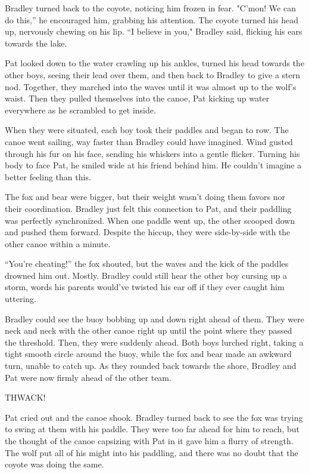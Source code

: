 Bradley turned back to the coyote, noticing him frozen in fear. "C'mon!
We can do this,'' he encouraged him, grabbing his attention. The coyote
turned his head up, nervously chewing on his lip. ``I believe in you,"
Bradley said, flicking his ears towards the lake.

Pat looked down to the water crawling up his ankles, turned his head
towards the other boys, seeing their lead over them, and then back to
Bradley to give a stern nod. Together, they marched into the waves until
it was almost up to the wolf's waist. Then they pulled themselves into
the canoe, Pat kicking up water everywhere as he scrambled to get
inside.

When they were situated, each boy took their paddles and began to row.
The canoe went sailing, way faster than Bradley could have imagined.
Wind gusted through his fur on his face, sending his whiskers into a
gentle flicker. Turning his body to face Pat, he smiled wide at his
friend behind him. He couldn't imagine a better feeling than this.

The fox and bear were bigger, but their weight wasn't doing them favors
nor their coordination. Bradley just felt this connection to Pat, and
their paddling was perfectly synchronized. When one paddle went up, the
other scooped down and pushed them forward. Despite the hiccup, they
were side-by-side with the other canoe within a minute.

``You're cheating!'' the fox shouted, but the waves and the kick of the
paddles drowned him out. Mostly. Bradley could still hear the other boy
cursing up a storm, words his parents would've twisted his ear off if
they ever caught him uttering.

Bradley could see the buoy bobbing up and down right ahead of them. They
were neck and neck with the other canoe right up until the point where
they passed the threshold. Then, they were suddenly ahead. Both boys
lurched right, taking a tight smooth circle around the buoy, while the
fox and bear made an awkward turn, unable to catch up. As they rounded
back towards the shore, Bradley and Pat were now firmly ahead of the
other team.

THWACK!

Pat cried out and the canoe shook. Bradley turned back to see the fox
was trying to swing at them with his paddle. They were too far ahead for
him to reach, but the thought of the canoe capsizing with Pat in it gave
him a flurry of strength. The wolf put all of his might into his
paddling, and there was no doubt that the coyote was doing the same.

